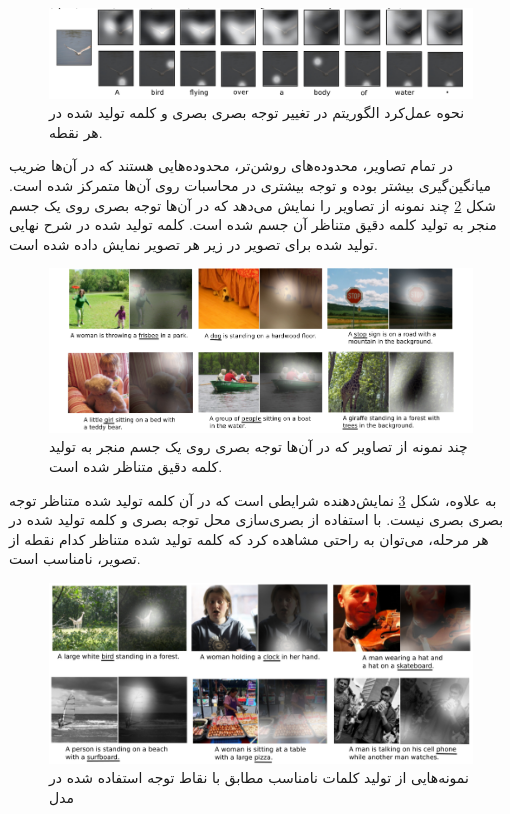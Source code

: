\begin{figure}[h]
	\centering
	\includegraphics[scale=0.4]{Imgs/show1.png}
	\caption{نحوه عمل‌کرد الگوریتم در تغییر توجه بصری بصری و کلمه تولید شده در هر نقطه. \cite{xu2015show}}
	\label{fig:show1}
\end{figure}  

در تمام تصاویر، محدوده‌های روشن‌تر، محدوده‌هایی هستند که در آن‌ها ضریب میانگین‌گیری بیشتر بوده و توجه بیشتری در محاسبات روی آن‌ها متمرکز شده است. شکل \ref{fig:show2} چند نمونه از تصاویر را نمایش می‌دهد که در آن‌ها توجه بصری روی یک جسم منجر به تولید کلمه دقیق متناظر آن جسم شده است. کلمه تولید شده در شرح نهایی تولید شده برای تصویر در زیر هر تصویر نمایش داده شده است.

\begin{figure}[h]
	\centering
	\includegraphics[scale=0.45]{Imgs/show2.png}
	\caption{چند نمونه از تصاویر که در آن‌ها توجه بصری روی یک جسم منجر به تولید کلمه دقیق متناظر شده است\cite{xu2015show}. }
	\label{fig:show2}
\end{figure}

به علاوه، شکل \ref{fig:show3} نمایش‌دهنده شرایطی است که در آن کلمه تولید شده متناظر توجه بصری بصری نیست. با استفاده از بصری‌سازی محل توجه بصری و کلمه تولید شده در هر مرحله، می‌توان به راحتی مشاهده کرد که کلمه تولید شده متناظر کدام نقطه از تصویر،‌ نامناسب است.

\begin{figure}[h]
	\centering
	\includegraphics[scale=0.4]{Imgs/show3.png}
	\caption{نمونه‌هایی از تولید کلمات نامناسب مطابق با نقاط توجه استفاده شده در مدل‌\cite{xu2015show}}
	\label{fig:show3}
\end{figure}

